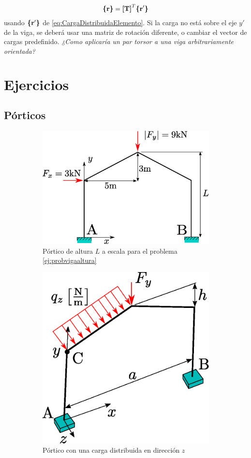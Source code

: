 \begin{equation}
	\boldsymbol{\{ }\mathbf{r} \boldsymbol{\}}= \boldsymbol{[}\mathbf{T} \boldsymbol{]}^T \boldsymbol{\{ }\mathbf{r'} \boldsymbol{\}}
\end{equation}
usando $\boldsymbol{\{ }\mathbf{r'} \boldsymbol{\}}$ de \eqref{eq:CargaDistribuidaElemento}. Si la carga no está sobre el eje $y'$ de la viga, se deberá usar una matriz de rotación diferente, o cambiar el vector de cargas predefinido. \textit{¿Como aplicaría un par torsor a una viga arbitrariamente orientada?}
 \clearpage
\section{Ejercicios}
\subsection*{Pórticos}

\begin{figure}[htb!]
	\centering
	\begin{subfigure}{0.49\linewidth}
		\centering
		\includegraphics[width=1\textwidth]{fig/ej1viga.eps}
		\caption{Pórtico de altura $L$ a escala para el problema \ref{ej:probvigaaltura} }
		\label{fig:ej1viga}
	\end{subfigure}
	\begin{subfigure}{0.49\linewidth}
		\centering
	\includegraphics[width=.663\textwidth]{fig/ej2viga.eps}
	\caption{Pórtico con una carga distribuida en dirección $z$}
	\label{fig:ej2viga}
	\end{subfigure}
\caption{}
\label{fig:ejPorticos}
\end{figure}
